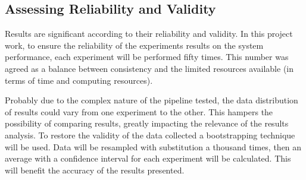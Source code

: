 \subsection{Assessing Reliability and Validity}

Results are significant according to their reliability and validity. In this project work, to ensure the reliability of the experiments results on the system performance, each experiment will be performed fifty times. This number was agreed as a balance between consistency and the limited resources available (in terms of time and computing resources).

Probably due to the complex nature of the pipeline tested, the data distribution of results could vary from one experiment to the other. This hampers the possibility of comparing results, greatly impacting the relevance of the results analysis. To restore the validity of the data collected a bootstrapping technique will be used. Data will be resampled with substitution a thousand times, then an average with a confidence interval for each experiment will be calculated. This will benefit the accuracy of the results presented.